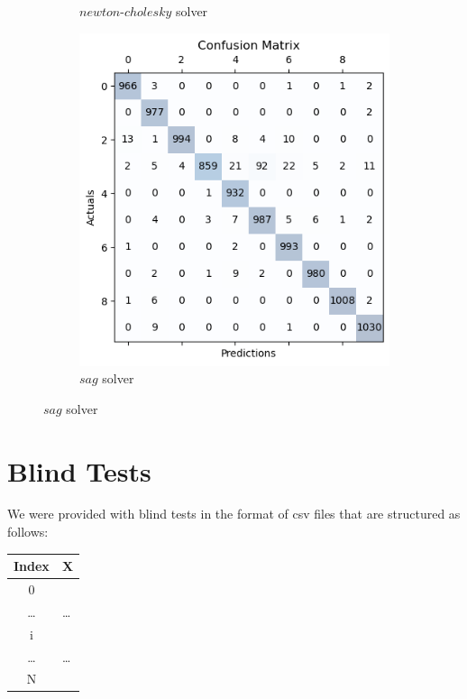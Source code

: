 \documentclass{article}
\begin{document}
\begin{titlepage}
\begin{figure}[htbp]
\begin{subfigure}[t]{0.3\linewidth}
      \caption{$newton$-$cholesky$ solver}
      \label{fig:sample6d}
    \end{subfigure}
    \hfill
    \begin{subfigure}[t]{0.3\linewidth}
      \includegraphics[width=\linewidth]{LRMC(sag).png}
      \caption{$sag$ solver}
      \label{fig:sample6f}
    \end{subfigure}
  \end{figure}

  \section*{Blind Tests}
  We were provided with blind tests in the format of csv files that are structured as follows:
  \newline
  \newline

  \begin{table}[htbp]
    \centering
    \begin{tabular}{|c|>{\centering\arraybackslash}m{8cm}|}
      \hline
      Index & X \\
      \hline
      0 & [$V^{(0)}_1$, $V^{(0)}_2$, ..., $V^{(0)}_j$, ... , $V^{(0)}_d$] \\
      \hline
      \dots & \dots \\
      \hline
      i & [$V^{(i)}_1$, $V^{(i)}_2$, ..., $V^{(i)}_j$, ... , $V^{(i)}_d$] \\
      \hline
      \dots & \dots \\
      \hline
      N & [$V^{(N)}_1$, $V^{(N)}_2$, ..., $V^{(N)}_j$, ... , $V^{(N)}_d$] \\
      \hline
    \end{tabular}
    \label{tab:sample}
  \end{table}


\end{titlepage}
\end{document}
